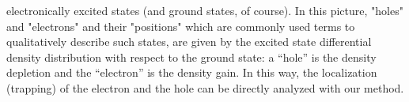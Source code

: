 \documentclass[a4paper,11pt,headings=normal]{scrartcl}
\begin{document}
\begin{itemize}
electronically excited states (and ground states, of course). In this picture, 
"holes" and "electrons" and their "positions" which are commonly used terms to 
qualitatively describe such states, are given by the excited state differential 
density distribution with respect to the ground state: a ``hole'' is the density 
depletion and the ``electron'' is the density gain. In this way, the localization 
(trapping) of the electron and the hole can be directly analyzed with our method.\\

\end{itemize}
\end{document}
